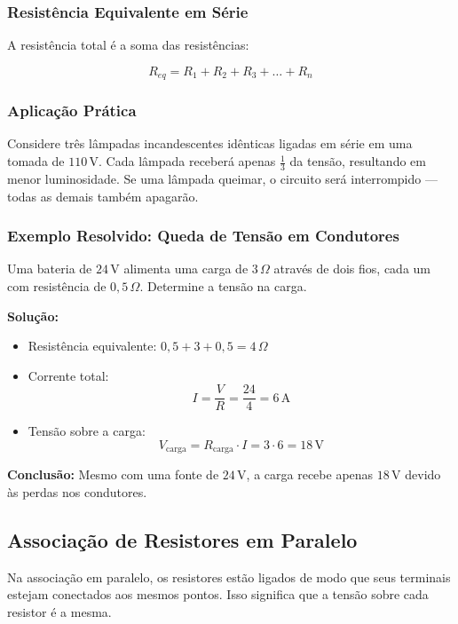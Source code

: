 \subsubsection{Resistência Equivalente em Série}
A resistência total é a soma das resistências:

\[
R_{eq} = R_1 + R_2 + R_3 + \dots + R_n
\]

\subsubsection{Aplicação Prática}
Considere três lâmpadas incandescentes idênticas ligadas em série em uma tomada de $110\,\text{V}$. Cada lâmpada receberá apenas $\frac{1}{3}$ da tensão, resultando em menor luminosidade. Se uma lâmpada queimar, o circuito será interrompido — todas as demais também apagarão.

\subsubsection{Exemplo Resolvido: Queda de Tensão em Condutores}
Uma bateria de $24\,\text{V}$ alimenta uma carga de $3\,\Omega$ através de dois fios, cada um com resistência de $0{,}5\,\Omega$. Determine a tensão na carga.

\textbf{Solução:}
\begin{itemize}
    \item Resistência equivalente: $0{,}5 + 3 + 0{,}5 = 4\,\Omega$
    \item Corrente total:
    \[
    I = \frac{V}{R} = \frac{24}{4} = 6\,\text{A}
    \]
    \item Tensão sobre a carga:
    \[
    V_{\text{carga}} = R_{\text{carga}} \cdot I = 3 \cdot 6 = 18\,\text{V}
    \]
\end{itemize}

\textbf{Conclusão:} Mesmo com uma fonte de $24\,\text{V}$, a carga recebe apenas $18\,\text{V}$ devido às perdas nos condutores.

\subsection{Associação de Resistores em Paralelo}
Na associação em paralelo, os resistores estão ligados de modo que seus terminais estejam conectados aos mesmos pontos. Isso significa que a tensão sobre cada resistor é a mesma.


